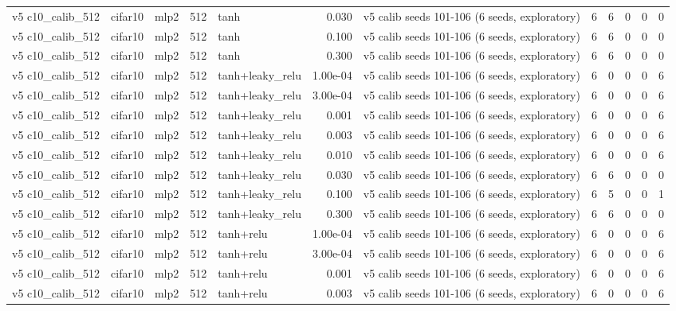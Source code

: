 \begin{table}[htbp]
{\begin{tabular}{@{}lllrlrlrrrrr@{}}
v5 c10\_calib\_512 & cifar10 & mlp2 & 512 & tanh & 0.030 & v5 calib seeds 101-106 (6 seeds, exploratory) & 6 & 6 & 0 & 0 & 0 \\
v5 c10\_calib\_512 & cifar10 & mlp2 & 512 & tanh & 0.100 & v5 calib seeds 101-106 (6 seeds, exploratory) & 6 & 6 & 0 & 0 & 0 \\
v5 c10\_calib\_512 & cifar10 & mlp2 & 512 & tanh & 0.300 & v5 calib seeds 101-106 (6 seeds, exploratory) & 6 & 6 & 0 & 0 & 0 \\
v5 c10\_calib\_512 & cifar10 & mlp2 & 512 & tanh+leaky\_relu & 1.00e-04 & v5 calib seeds 101-106 (6 seeds, exploratory) & 6 & 0 & 0 & 0 & 6 \\
v5 c10\_calib\_512 & cifar10 & mlp2 & 512 & tanh+leaky\_relu & 3.00e-04 & v5 calib seeds 101-106 (6 seeds, exploratory) & 6 & 0 & 0 & 0 & 6 \\
v5 c10\_calib\_512 & cifar10 & mlp2 & 512 & tanh+leaky\_relu & 0.001 & v5 calib seeds 101-106 (6 seeds, exploratory) & 6 & 0 & 0 & 0 & 6 \\
v5 c10\_calib\_512 & cifar10 & mlp2 & 512 & tanh+leaky\_relu & 0.003 & v5 calib seeds 101-106 (6 seeds, exploratory) & 6 & 0 & 0 & 0 & 6 \\
v5 c10\_calib\_512 & cifar10 & mlp2 & 512 & tanh+leaky\_relu & 0.010 & v5 calib seeds 101-106 (6 seeds, exploratory) & 6 & 0 & 0 & 0 & 6 \\
v5 c10\_calib\_512 & cifar10 & mlp2 & 512 & tanh+leaky\_relu & 0.030 & v5 calib seeds 101-106 (6 seeds, exploratory) & 6 & 6 & 0 & 0 & 0 \\
v5 c10\_calib\_512 & cifar10 & mlp2 & 512 & tanh+leaky\_relu & 0.100 & v5 calib seeds 101-106 (6 seeds, exploratory) & 6 & 5 & 0 & 0 & 1 \\
v5 c10\_calib\_512 & cifar10 & mlp2 & 512 & tanh+leaky\_relu & 0.300 & v5 calib seeds 101-106 (6 seeds, exploratory) & 6 & 6 & 0 & 0 & 0 \\
v5 c10\_calib\_512 & cifar10 & mlp2 & 512 & tanh+relu & 1.00e-04 & v5 calib seeds 101-106 (6 seeds, exploratory) & 6 & 0 & 0 & 0 & 6 \\
v5 c10\_calib\_512 & cifar10 & mlp2 & 512 & tanh+relu & 3.00e-04 & v5 calib seeds 101-106 (6 seeds, exploratory) & 6 & 0 & 0 & 0 & 6 \\
v5 c10\_calib\_512 & cifar10 & mlp2 & 512 & tanh+relu & 0.001 & v5 calib seeds 101-106 (6 seeds, exploratory) & 6 & 0 & 0 & 0 & 6 \\
v5 c10\_calib\_512 & cifar10 & mlp2 & 512 & tanh+relu & 0.003 & v5 calib seeds 101-106 (6 seeds, exploratory) & 6 & 0 & 0 & 0 & 6 \\

\end{tabular}}
\end{table}
